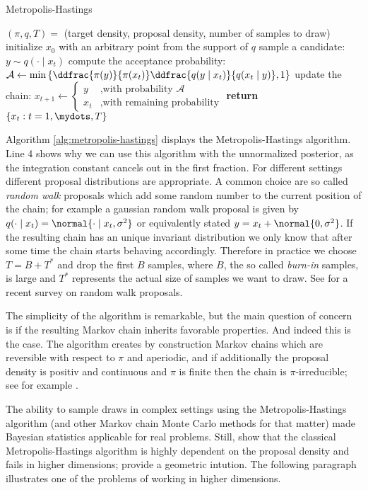 \begin{algorithm}
\caption{Metropolis-Hastings}\label{alg:metropolis-hastings}
\begin{algorithmic}[1]
  \Require $(\pi, q, T) =$ (target density, proposal density, number of samples to draw)
\State initialize $x_0$ with an arbitrary point from the support of $q$
  \State sample a candidate: $y \sim q(\cdot \mid x_t)$
  \State compute the acceptance probability: $\mathcal{A} \gets \min\left\{ \ddfrac{\pi(y)}{\pi(x_t)} \ddfrac{q(y \mid x_t)}{q(x_t \mid y)}, 1\right\}$
  \State update the chain: $x_{t+1} \gets \begin{cases} y &\mbox{,with probability } \mathcal{A}\\ x_t &\mbox{,with remaining probability} \end{cases}$
\EndFor{}
\State \textbf{return} $\{x_t : t = 1,\mydots,T\}$
\end{algorithmic}
\end{algorithm}

\noindent
Algorithm \ref{alg:metropolis-hastings} displays the Metropolis-Hastings algorithm.
Line 4 shows why we can use this algorithm with the unnormalized posterior, as the integration constant cancels out in the first fraction.
For different settings different proposal distributions are appropriate.
A common choice are so called \emph{random walk} proposals which add some random number to the current position of the chain; for example a gaussian random walk proposal is given by $q(\cdot \mid x_t) = \normal{\cdot \mid x_t, \sigma^2}$ or equivalently stated $y = x_t + \normal{0, \sigma^2}$.
If the resulting chain has an unique invariant distribution we only know that after some time the chain starts behaving accordingly.
Therefore in practice we choose $T = B + T^*$ and drop the first $B$ samples, where $B$, the so called \emph{burn-in} samples, is large and $T^*$ represents the actual size of samples we want to draw.
See \citet{sherlock2010} for a recent survey on random walk proposals.

The simplicity of the algorithm is remarkable, but the main question of concern is if the resulting Markov chain inherits favorable properties.
And indeed this is the case.
The algorithm creates by construction Markov chains which are reversible with respect to $\pi$ and aperiodic, and if additionally the proposal density is positiv and continuous and $\pi$ is finite then the chain is $\pi$-irreducible; see for example \citet{roberts2004}.

The ability to sample draws in complex settings using the Metropolis-Hastings algorithm (and other Markov chain Monte Carlo methods for that matter) made Bayesian statistics applicable for real problems.
Still, \citet{Au2001EstimationOS} show that the classical Metropolis-Hastings algorithm is highly dependent on the proposal density and fails in higher dimensions; \citet{zuev08} provide a geometric intution.
The following paragraph illustrates one of the problems of working in higher dimensions.

